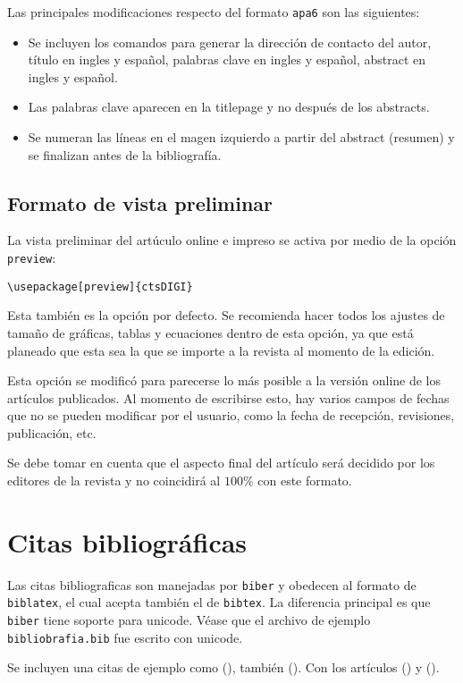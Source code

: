 \documentclass[submit,biblatex]{ctsDIGI}
\begin{document}
Las principales modificaciones respecto del formato \texttt{apa6} son las siguientes:
\begin{itemize}
\item Se incluyen los comandos para generar la dirección de contacto del autor, título en ingles y español, palabras clave en ingles y español, abstract en ingles y español.
\item Las palabras clave aparecen en la titlepage y no después de los abstracts.
\item Se numeran las líneas en el magen izquierdo a partir del abstract (resumen) y se finalizan antes de la bibliografía.
\end{itemize}


\subsection{Formato de vista preliminar}
La vista preliminar del artúculo online e impreso se activa por medio de la opción \texttt{preview}:
\begin{verbatim}
\usepackage[preview]{ctsDIGI}
\end{verbatim}

Esta también es la opción por defecto. Se recomienda hacer todos los ajustes de tamaño de gráficas, tablas y ecuaciones dentro de esta opción, ya que está planeado que esta sea la que se importe a la revista al momento de la edición.

Esta opción se modificó para parecerse lo más posible a la versión online de los artículos publicados. Al momento de escribirse esto, hay varios campos de fechas que no se pueden modificar por el usuario, como la fecha de recepción, revisiones, publicación, etc.

Se debe tomar en cuenta que el aspecto final del artículo será decidido por los editores de la revista y no coincidirá al $100\%$ con este formato.

\section{Citas bibliográficas}
Las citas bibliograficas son manejadas por \texttt{biber} y obedecen al formato de \texttt{biblatex}, el cual acepta también el de \texttt{bibtex}. La diferencia principal es que \texttt{biber} tiene soporte para unicode. Véase que el archivo de ejemplo \texttt{bibliobrafia.bib} fue escrito con unicode. 

Se incluyen una citas de ejemplo como (\cite{halliday1986fundamentos}), también (\cite{knoll2010radiation}). Con los artículos (\cite{Maldacena:2016upp}) y (\cite{Aparicio:2016qqb}).
\end{document}
